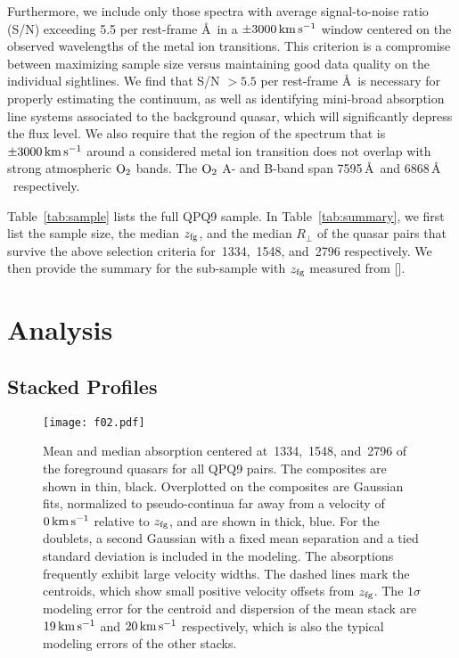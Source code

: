 \documentclass[iop]{emulateapj}
\begin{document}
Furthermore, we include only those spectra with average signal-to-noise ratio (S/N) exceeding 5.5 
per rest-frame \AA \ in a $\pm3000\,{\rm km\,s^{-1}}$ window centered on the observed wavelengths 
of the metal ion transitions. This criterion is a compromise between maximizing sample size versus 
maintaining good data quality on the individual sightlines. We find that S/N $>5.5$ per rest-frame 
\AA \ is necessary for properly estimating the continuum, as well as identifying mini-broad 
absorption line systems associated to the background quasar, which will significantly depress the 
flux level. We also require that the region of the spectrum that is $\pm3000\,{\rm km\,s^{-1}}$ 
around a considered metal ion transition does not overlap with strong atmospheric ${\rm O}_2$ 
bands. The ${\rm O}_2$ A- and B-band span 7595\,\AA \ and 6868\,\AA 
\ respectively. 

Table~\ref{tab:sample} lists the full QPQ9 sample. In Table~\ref{tab:summary}, we first list the 
sample size, the median $z_{\rm fg}$, and the median $R_\perp$ of the quasar pairs that survive 
the above selection criteria for \,1334, \,1548, and \,2796 
respectively. We then provide the summary for the sub-sample with $z_{\rm fg}$ measured from 
[]. 

\section{Analysis}
\label{sec:analysis}

\subsection{Stacked Profiles}
\label{sec:stacks}

\begin{figure}
\texttt{[image: f02.pdf]}
\caption{Mean and median absorption centered at \,1334, \,1548, and 
\,2796 of the foreground quasars for all QPQ9 pairs. The composites are shown in thin, 
black. Overplotted on the composites are Gaussian fits, normalized to pseudo-continua far away 
from a velocity of $0\,{\rm km\,s^{-1}}$ relative to $z_{\rm fg}$, and are shown in thick, blue. 
For the doublets, a second Gaussian with a fixed mean separation and a tied standard deviation is 
included in the modeling. The absorptions frequently exhibit large velocity widths. The dashed 
lines mark the centroids, which show small positive velocity offsets from $z_{\rm fg}$. The 
$1\sigma$ modeling error for the centroid and dispersion of the  mean stack are 
$19\,{\rm km\,s^{-1}}$ and $20\,{\rm km\,s^{-1}}$ respectively, which is also the typical modeling 
errors of the other stacks.
}
\label{fig:stacks_and_fits}
\end{figure}
\end{document}
